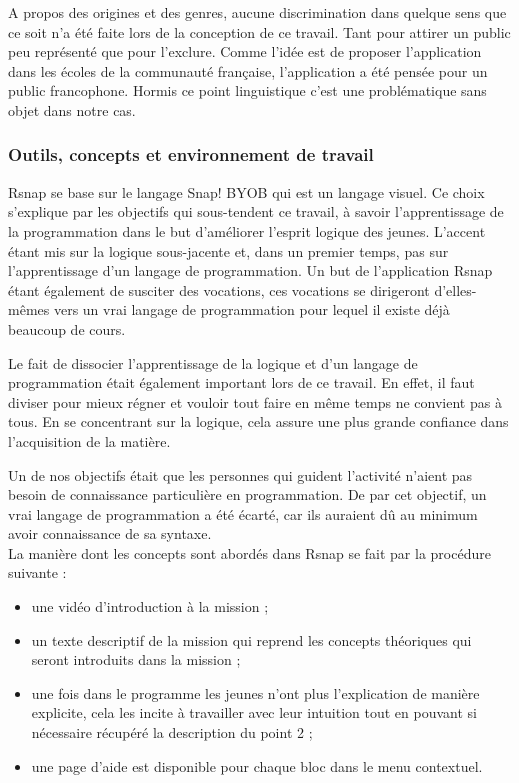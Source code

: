 A propos des origines et des genres, aucune discrimination dans quelque sens que ce soit n'a été faite lors de la conception de ce travail. Tant pour attirer un public peu représenté que pour l'exclure. Comme l'idée est de proposer l'application dans les écoles de la communauté française, l'application a été pensée pour un public francophone. Hormis ce point linguistique c'est une problématique sans objet dans notre cas.

\subsubsection{Outils, concepts et environnement de travail} 
\label{SNAP}
Rsnap se base sur le langage Snap! BYOB qui est un langage visuel. Ce choix s'explique par les objectifs qui sous-tendent ce travail, à savoir l'apprentissage de la programmation dans le but d'améliorer l'esprit logique des jeunes. L'accent étant mis sur la logique sous-jacente et, dans un premier temps, pas sur l'apprentissage d'un langage de programmation. Un but de l'application Rsnap étant également de susciter des vocations, ces vocations se dirigeront d'elles-mêmes vers un vrai langage de programmation pour lequel il existe déjà beaucoup de cours.

Le fait de dissocier l'apprentissage de la logique et d'un langage de programmation était également important lors de ce travail. En effet, il faut diviser pour mieux régner et vouloir tout faire en même temps ne convient pas à tous. En se concentrant sur la logique, cela assure une plus grande confiance dans l'acquisition de la matière.

Un de nos objectifs était que les personnes qui guident l'activité n'aient pas besoin de connaissance particulière en programmation. De par cet objectif, un vrai langage de programmation a été écarté, car ils auraient dû au minimum avoir connaissance de sa syntaxe.\\

La manière dont les concepts sont abordés dans Rsnap se fait par la procédure suivante :
\begin{itemize}
	\item une vidéo d'introduction à la mission ;
	\item un texte descriptif de la mission qui reprend les concepts théoriques qui seront introduits dans la mission ;
	\item une fois dans le programme les jeunes n'ont plus l'explication de manière explicite, cela les incite à travailler avec leur intuition tout en pouvant si nécessaire récupéré la description du point 2 ;
	\item une page d'aide est disponible pour chaque bloc dans le menu contextuel.
\end{itemize}

